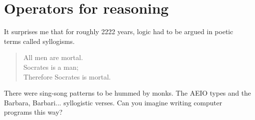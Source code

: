 \section{Operators for reasoning}

It surprises me that for roughly 2222 years, logic had to be argued 
in poetic terms called syllogisms.  
\begin{quote}
    All men are mortal.\\
    Socrates is a man;\\
    Therefore Socrates is mortal.
\end{quote}
There were sing-song patterns 
to be hummed by monks. The AEIO types and the Barbara, Barbari...  
syllogistic verses.
Can you imagine writing computer programs this way?

